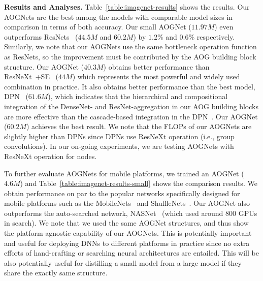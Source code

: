 \documentclass[10pt,twocolumn,letterpaper]{article}
\begin{document}
\textbf{Results and Analyses.} Table~\ref{table:imagenet-results} shows the results. Our AOGNets are the best among the models with comparable model sizes in comparison in terms of both accuracy. %
Our small AOGNet ($11.97M$) even outperforms ResNets~\cite{ResidualNet} ($44.5M$ and $60.2M$) by $1.2\%$ and $0.6\%$ respectively. Similarly, we note that our AOGNets use the same bottleneck operation function as ResNets, so the improvement must be contributed by the AOG building block structure. Our AOGNet ($40.3M$) obtains better performance than ResNeXt~\cite{ResNeXt}+SE~\cite{SENet} ($44M$) which represents the most powerful and widely used combination in practice. It also obtains better performance than the best model, DPN~\cite{DPN} ($61.6M$), which indicates that the hierarchical and compositional integration of the DenseNet- and ResNet-aggregation in our AOG building blocks are more effective than the cascade-based integration in the DPN~\cite{DPN}. Our AOGNet ($60.2M$) achieves the best result. We note that the FLOPs of our AOGNets are slightly higher than DPNs since DPNs use ResNeXt operation (i.e., group convolutions). In our on-going experiments, we are testing AOGNets with ResNeXt operation for nodes.   

To further evaluate AOGNets for mobile platforms, we trained an AOGNet ($4.6M$) and Table~\ref{table:imagenet-results-small} shows the comparison results. We obtain performance on par to the popular networks specifically designed for mobile platforms such as the MobileNets~\cite{howard2017mobilenets,sandler2018mobilenetv2} and ShuffleNets~\cite{zhang2017shufflenet}. Our AOGNet also outperforms the auto-searched network, NASNet~\cite{zoph2017learning} (which used around 800 GPUs in search). We note that we used the same AOGNet structures, and thus show the platform-agnostic  capability of our AOGNets. This is potentially  important and useful for deploying DNNs to different platforms in practice since no extra efforts of hand-crafting or searching neural architectures are entailed. This will be also potentially useful for distilling a small model from a large model if they share the exactly same structure.  
\end{document}
